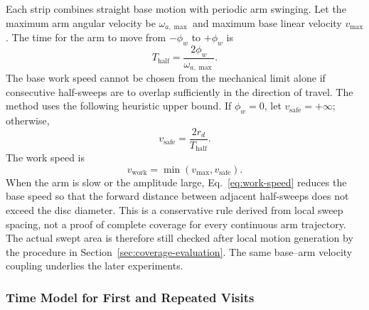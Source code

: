 Each strip combines straight base motion with periodic arm swinging. Let the maximum arm angular velocity be $\omega_{a,\max}$ and maximum base linear velocity $v_{\max}$. The time for the arm to move from $-\phi_w$ to $+\phi_w$ is
\begin{equation}
T_{\mathrm{half}}=\frac{2\phi_w}{\omega_{a,\max}}.
\tag{15}
\label{eq:half-cycle}
\end{equation}
The base work speed cannot be chosen from the mechanical limit alone if consecutive half-sweeps are to overlap sufficiently in the direction of travel. The method uses the following heuristic upper bound. If $\phi_w=0$, let $v_{\mathrm{safe}}=+\infty$; otherwise,
\begin{equation}
v_{\mathrm{safe}}=\frac{2r_d}{T_{\mathrm{half}}}.
\tag{16}
\label{eq:safe-speed}
\end{equation}
The work speed is
\begin{equation}
v_{\mathrm{work}}=\min(v_{\max},v_{\mathrm{safe}}).
\tag{17}
\label{eq:work-speed}
\end{equation}
When the arm is slow or the amplitude large, Eq.~\eqref{eq:work-speed} reduces the base speed so that the forward distance between adjacent half-sweeps does not exceed the disc diameter. This is a conservative rule derived from local sweep spacing, not a proof of complete coverage for every continuous arm trajectory. The actual swept area is therefore still checked after local motion generation by the procedure in Section~\ref{sec:coverage-evaluation}. The same base--arm velocity coupling underlies the later experiments.

\subsubsection{Time Model for First and Repeated Visits}

